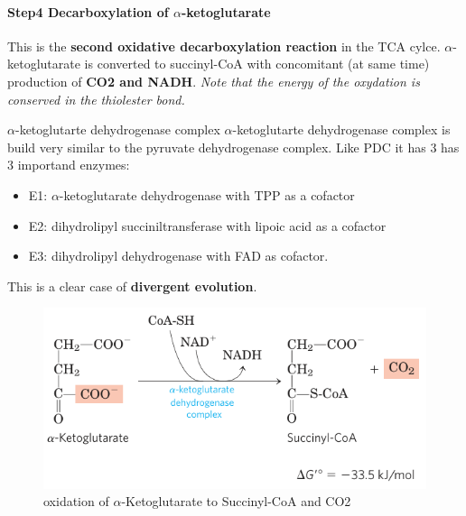 \documentclass[../main.tex]{subfiles}
\begin{document}
\paragraph{Step4 Decarboxylation of $\alpha$-ketoglutarate}
This is the \textbf{second oxidative decarboxylation reaction} in the TCA cylce. $\alpha$-ketoglutarate is converted to succinyl-CoA with concomitant (at same time) production of \textbf{CO2 and NADH}. \textit{Note that the energy of the oxydation is conserved in the thiolester bond.}

\begin{RemarkWithTitel}{$\alpha$-ketoglutarte dehydrogenase complex}
	$\alpha$-ketoglutarte dehydrogenase complex is build very similar to the pyruvate dehydrogenase complex. Like PDC it has 3 has 3 importand enzymes: 
	\begin{itemize}
		\item E1: $\alpha$-ketoglutarate dehydrogenase with TPP as a cofactor
		\item E2: dihydrolipyl succiniltransferase with lipoic acid as a cofactor
		\item E3: dihydrolipyl dehydrogenase with FAD as cofactor. 
	\end{itemize}
	\noindent This is a clear case of \textbf{divergent evolution}. 
\end{RemarkWithTitel}

\begin{figure}[H]
	\centering
	\includegraphics[height = 4 cm]{TCAS4}
	\caption{oxidation of $\alpha$-Ketoglutarate to Succinyl-CoA and CO2}
\end{figure}
\end{document}
